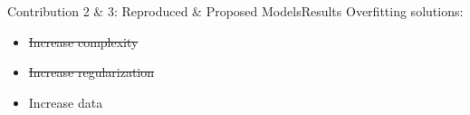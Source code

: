 \begin{frame}{Contribution 2 \& 3: Reproduced \& Proposed Models}{Results}
    Overfitting solutions:
    \begin{itemize}
        \item \sout{Increase complexity}
        \item \sout{Increase regularization}
        \item Increase data
    \end{itemize}
\end{frame}





